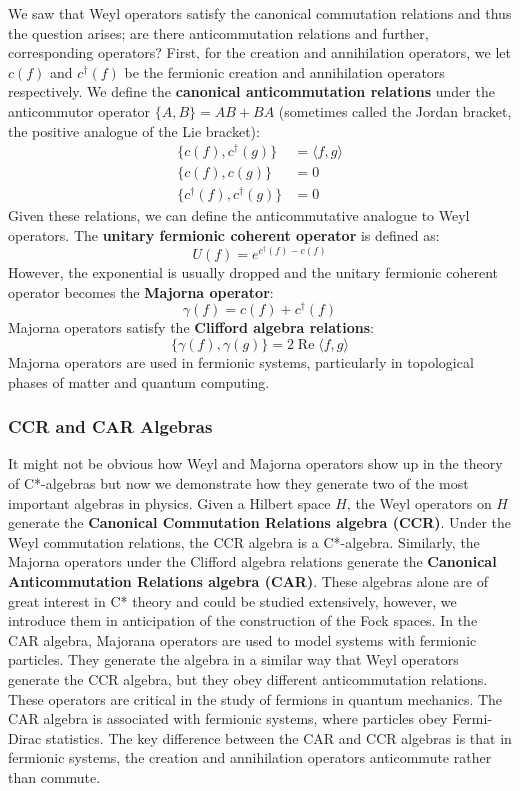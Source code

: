 \noindent We saw that Weyl operators satisfy the canonical commutation relations and thus
the question arises; are there anticommutation relations and further, corresponding
operators? First, for the creation and annihilation operators, we let $c(f)$ and $c^\dagger(f)$
be the fermionic creation and annihilation operators respectively. We define the
\textbf{canonical anticommutation relations} under the anticommutor operator $\{A,B\} = AB + BA$
(sometimes called the Jordan bracket, the positive analogue of the Lie bracket):
\begin{align}
    \{ c(f), c^\dagger (g)\} &= \langle f,g \rangle\\
    \{ c(f), c(g)\} &=0\\
    \{ c^\dagger(f), c^\dagger(g)\} &= 0
\end{align}
Given these relations, we can define the anticommutative analogue to Weyl operators.
The \textbf{unitary fermionic coherent operator} is defined as:
\begin{equation}
    U(f) = e^{c^\dagger(f) - c(f)}
\end{equation}
However, the exponential is usually dropped and the unitary fermionic coherent operator
becomes the \textbf{Majorna operator}:
\begin{equation}
    \gamma(f) = c(f) + c^\dagger(f)
\end{equation}
Majorna operators satisfy the \textbf{Clifford algebra relations}:
\begin{equation}
    \{ \gamma(f), \gamma(g) \} = 2 \operatorname{Re} \langle f, g \rangle
\end{equation}
Majorna operators are used in fermionic systems, particularly in topological phases
of matter and quantum computing.

\subsubsection{CCR and CAR Algebras}
It might not be obvious how Weyl and Majorna operators show up in the theory of C*-algebras
but now we demonstrate how they generate two of the most important algebras in
physics. Given a Hilbert space $H$, the Weyl operators on $H$ generate the
\textbf{Canonical Commutation Relations algebra (CCR)}. Under the Weyl commutation relations,
the CCR algebra is a C*-algebra. Similarly, the Majorna operators under
the Clifford algebra relations generate the \textbf{Canonical Anticommutation Relations algebra (CAR)}.
These algebras alone are of great interest in C* theory and could be studied extensively,
however, we introduce them in anticipation of the construction of the Fock spaces.
In the CAR algebra, Majorana operators are used to model systems with fermionic
particles. They generate the algebra in a similar way that Weyl operators generate
the CCR algebra, but they obey different anticommutation relations. These operators
are critical in the study of fermions in quantum mechanics. The CAR algebra is associated
with fermionic systems, where particles obey Fermi-Dirac statistics. The key difference
between the CAR and CCR algebras is that in fermionic systems, the creation and
annihilation operators anticommute rather than commute.


